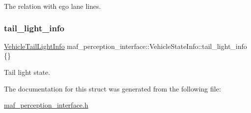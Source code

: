 The relation with ego lane lines. 

\mbox{\label{structmaf__perception__interface_1_1VehicleStateInfo_a6de7d9122b57bbf5a95523fac0d82b1e}} 
\subsubsection{\texorpdfstring{tail\+\_\+light\+\_\+info}{tail\_light\_info}}
{\footnotesize\ttfamily \hyperlink{structmaf__perception__interface_1_1VehicleTailLightInfo}{Vehicle\+Tail\+Light\+Info} maf\+\_\+perception\+\_\+interface\+::\+Vehicle\+State\+Info\+::tail\+\_\+light\+\_\+info \{\}}



Tail light state. 



The documentation for this struct was generated from the following file\+:\begin{DoxyCompactItemize}
\item 
\hyperlink{maf__perception__interface_8h}{maf\+\_\+perception\+\_\+interface.\+h}\end{DoxyCompactItemize}
